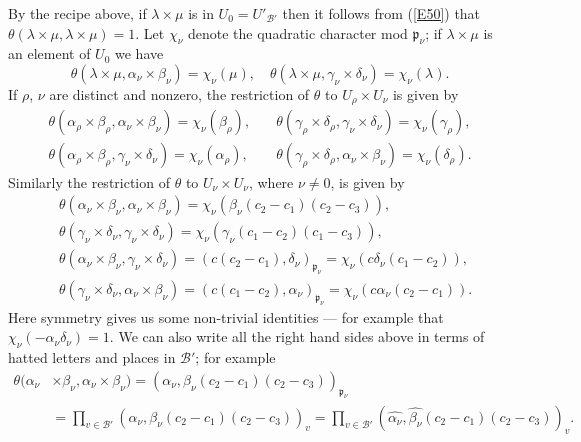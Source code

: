 \documentclass[12pt]{article}
\def\fp{{\mathfrak p}}
\def\ga{{\alpha}}
\def\gb{{\beta}}
\def\gg{{\gamma}}
\def\gd{{\delta}}
\def\gl{{\lambda}}
\def\gt{{\theta}}
\def\sB{{\mathcal B}}
\begin{document}
By the recipe above, if $\gl\times\mu$ is in $U_0=U'_{\sB'}$
then it follows from (\ref{E50}) that
$\gt(\gl\times\mu,\gl\times\mu)=1$.
Let $\chi_\nu$ denote the quadratic character
mod $\fp_\nu$; if $\gl\times\mu$ is an element of $U_0$ we have
\[ \gt(\gl\times\mu,\ga_\nu\times\gb_\nu)=\chi_\nu(\mu),
\quad \gt(\gl\times\mu,\gg_\nu\times\gd_\nu)=\chi_\nu(\gl). \]
If $\rho$, $\nu$ are distinct and nonzero, the restriction of $\gt$
to $U_\rho\times U_\nu$ is given by
\begin{align*}
\gt(\ga_\rho\times\gb_\rho,\ga_\nu\times\gb_\nu)=\chi_\nu(\gb_\rho), & \quad
\gt(\gg_\rho\times\gd_\rho,\gg_\nu\times\gd_\nu)=\chi_\nu(\gg_\rho), \\
\gt(\ga_\rho\times\gb_\rho,\gg_\nu\times\gd_\nu)=\chi_\nu(\ga_\rho), & \quad
\gt(\gg_\rho\times\gd_\rho,\ga_\nu\times\gb_\nu)=\chi_\nu(\gd_\rho).
\end{align*}
Similarly the restriction of $\gt$ to $U_\nu\times U_\nu$,
where $\nu\neq0$, is given by
\begin{align*}
 & \gt(\ga_\nu\times\gb_\nu,\ga_\nu\times\gb_\nu)=\chi_\nu(\gb_\nu(c_2-c_1)(c_2-c_3)), \\
 & \gt(\gg_\nu\times\gd_\nu,\gg_\nu\times\gd_\nu)=\chi_\nu(\gg_\nu(c_1-c_2)(c_1-c_3)), \\
 & \gt(\ga_\nu\times\gb_\nu,\gg_\nu\times\gd_\nu)=(c(c_2-c_1),\gd_\nu)_{\fp_\nu}=\chi_\nu(c\gd_\nu(c_1-c_2)), \\
 & \gt(\gg_\nu\times\gd_\nu,\ga_\nu\times\gb_\nu)=(c(c_1-c_2),\ga_\nu)_{\fp_\nu}=\chi_\nu(c\ga_\nu(c_2-c_1)).
\end{align*}
Here symmetry gives us some non-trivial identities --- for example that
$\chi_\nu(-\ga_\nu\gd_\nu)=1$. We can also write all the right hand sides
above in terms of hatted letters and places in $\sB'$; for example
\begin{align*}
\gt(\ga_\nu & \times\gb_\nu,\ga_\nu\times\gb_\nu)=(\ga_\nu,\gb_\nu(c_2-c_1)
(c_2-c_3))_{\fp_\nu} \\
 & =\prod_{v\in\sB'}(\ga_\nu,\gb_\nu(c_2-c_1)(c_2-c_3))_v
=\prod_{v\in\sB'}(\widehat{\ga_\nu},\widehat{\gb_\nu}(c_2-c_1)(c_2-c_3))_v.
\end{align*}
\end{document}
